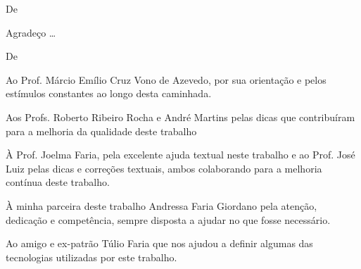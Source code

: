 \begin{agradecimentos}

De \imprimirAutorUm
\newline
\par Agradeço \ldots

\vspace*{\fill}
De \imprimirAutorDois
\newline

\par Ao Prof. Márcio Emílio Cruz Vono de Azevedo, por sua orientação e pelos estímulos constantes ao longo desta caminhada.

\par Aos Profs. Roberto Ribeiro Rocha e André Martins pelas dicas que contribuíram para a melhoria da qualidade deste trabalho 

\par À Prof. Joelma Faria, pela excelente ajuda textual neste trabalho e ao Prof. José Luiz pelas dicas e correções textuais, ambos colaborando para a melhoria contínua deste trabalho.

\par À minha parceira deste trabalho Andressa Faria Giordano pela atenção, dedicação e competência, sempre disposta a ajudar no que fosse necessário.

\par Ao amigo e ex-patrão Túlio Faria que nos ajudou a definir algumas das tecnologias utilizadas por este trabalho.

\end{agradecimentos}




